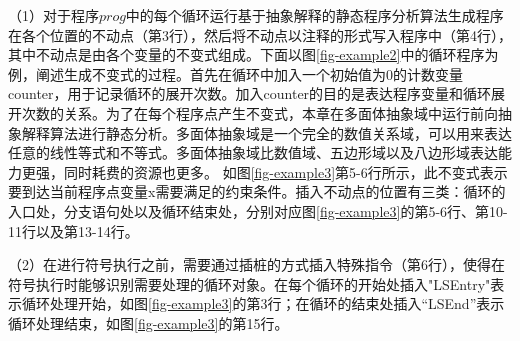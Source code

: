 
%
%
%
%


（1）对于程序$prog$中的每个循环运行基于抽象解释的静态程序分析算法生成程序在各个位置的不动点（第3行），然后将不动点以注释的形式写入程序中（第4行），其中不动点是由各个变量的不变式组成。下面以图\ref{fig-example2}中的循环程序为例，阐述生成不变式的过程。首先在循环中加入一个初始值为0的计数变量counter，用于记录循环的展开次数。加入counter的目的是表达程序变量和循环展开次数的关系。为了在每个程序点产生不变式，本章在多面体抽象域中运行前向抽象解释算法进行静态分析。多面体抽象域是一个完全的数值关系域，可以用来表达任意的线性等式和不等式。多面体抽象域比数值域、五边形域以及八边形域表达能力更强，同时耗费的资源也更多。
如图\ref{fig-example3}第5-6行所示，此不变式表示要到达当前程序点变量x需要满足的约束条件。插入不动点的位置有三类：循环的入口处，分支语句处以及循环结束处，分别对应图\ref{fig-example3}的第5-6行、第10-11行以及第13-14行。

（2）在进行符号执行之前，需要通过插桩的方式插入特殊指令（第6行），使得在符号执行时能够识别需要处理的循环对象。在每个循环的开始处插入"LSEntry"表示循环处理开始，如图\ref{fig-example3}的第3行；在循环的结束处插入“LSEnd”表示循环处理结束，如图\ref{fig-example3}的第15行。

